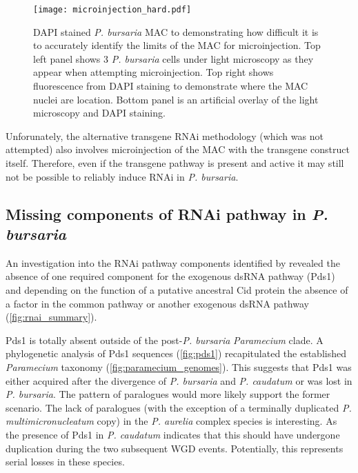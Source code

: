 \begin{figure}
    \centering
    \texttt{[image: microinjection\_hard.pdf]}
    \caption[DAPI Stained \textit{P. bursaria} MAC]{
        DAPI stained \textit{P. bursaria}
        MAC to demonstrating how difficult it is to accurately identify the limits
        of the MAC for microinjection.  Top left panel shows 3 \textit{P. bursaria}
    cells under light microscopy as they appear when attempting
microinjection. Top right shows fluorescence from DAPI staining to demonstrate
where the MAC nuclei are location.  Bottom panel is an artificial overlay
of the light microscopy and DAPI staining.}
    \label{fig:microinjection_nucleus}
\end{figure}

Unforunately, the alternative transgene RNAi methodology \citep{Galvani2001} 
(which was not attempted) also involves microinjection of the MAC with
the transgene construct itself.  Therefore, even if the transgene
pathway is present and active it may still not be possible to reliably
induce RNAi in \textit{P. bursaria}.

\subsection{Missing components of RNAi pathway in \textit{P. bursaria}}

An investigation into the RNAi pathway components identified by \citep{Marker2014}
revealed the absence of one required component for the exogenous dsRNA
pathway (Pds1) and depending on the function of a putative ancestral
Cid protein the absence of a factor in the common pathway or another
exogenous dsRNA pathway (\cref{fig:rnai_summary}).


Pds1 is totally absent outside of the post-\textit{P. bursaria} 
\textit{Paramecium} clade.
A phylogenetic analysis of Pds1 sequences (\cref{fig:pds1}) 
recapitulated the established 
\textit{Paramecium} taxonomy (\cref{fig:paramecium_genomes}).
This suggests that Pds1 was either acquired after the divergence of \textit{P. bursaria}
and \textit{P. caudatum} or was lost in \textit{P. bursaria}.
The pattern of paralogues would more likely support the former scenario.
The lack of paralogues (with the exception of a terminally duplicated \textit{P. multimicronucleatum}
copy) in the \textit{P. aurelia} complex species is interesting.  As the presence
of Pds1 in \textit{P. caudatum} indicates that this should have undergone
duplication during the two subsequent WGD events.  Potentially, this represents
serial losses in these species.


